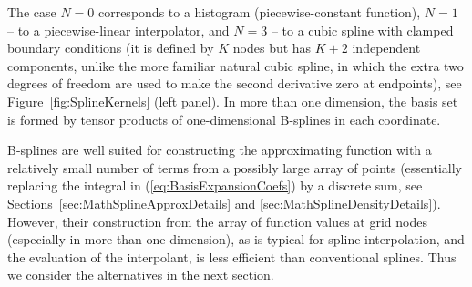 \documentclass[12pt]{article}
\begin{document}
The case $N=0$ corresponds to a histogram (piecewise-constant function), $N=1$ -- to a piecewise-linear interpolator, and $N=3$ -- to a cubic spline with clamped boundary conditions (it is defined by $K$ nodes but has $K+2$ independent components, unlike the more familiar natural cubic spline, in which the extra two degrees of freedom are used to make the second derivative zero at endpoints), see Figure~\ref{fig:SplineKernels} (left panel). In more than one dimension, the basis set is formed by tensor products of one-dimensional B-splines in each coordinate.

B-splines are well suited for constructing the approximating function with a relatively small number of terms from a possibly large array of points (essentially replacing the integral in (\ref{eq:BasisExpansionCoefs}) by a discrete sum, see Sections~\ref{sec:MathSplineApproxDetails} and \ref{sec:MathSplineDensityDetails}). However, their construction from the array of function values at grid nodes (especially in more than one dimension), as is typical for spline interpolation, and the evaluation of the interpolant, is less efficient than conventional splines. Thus we consider the alternatives in the next section.
\end{document}
